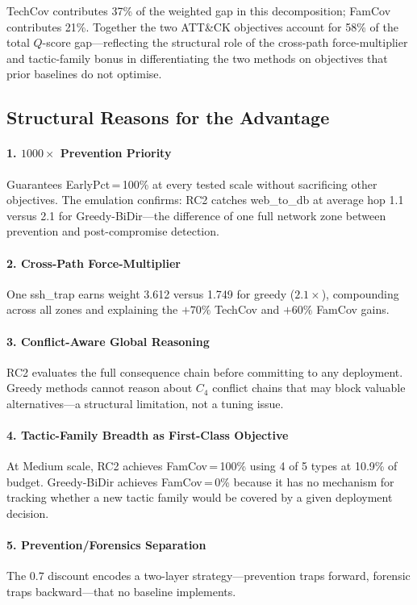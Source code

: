 \documentclass[journal]{IEEEtran}
\newcommand{\qscore}{$Q$-score}
\begin{document}
TechCov contributes 37\% of the weighted gap in this decomposition;
FamCov contributes 21\%. Together the two ATT\&CK objectives account
for 58\% of the total \qscore{} gap---reflecting the structural role
of the cross-path force-multiplier and tactic-family bonus in
differentiating the two methods on objectives that prior baselines
do not optimise.

\subsection{Structural Reasons for the Advantage}

\paragraph{1. $1000\times$ Prevention Priority}
Guarantees EarlyPct\,=\,100\% at every tested scale without
sacrificing other objectives. The emulation confirms: RC2 catches
web\_to\_db at average hop 1.1 versus 2.1 for Greedy-BiDir---the
difference of one full network zone between prevention and
post-compromise detection.

\paragraph{2. Cross-Path Force-Multiplier}
One ssh\_trap earns weight 3.612 versus 1.749 for greedy
($2.1\times$), compounding across all zones and explaining the
$+70\%$ TechCov and $+60\%$ FamCov gains.

\paragraph{3. Conflict-Aware Global Reasoning}
RC2 evaluates the full consequence chain before committing to
any deployment. Greedy methods cannot reason about $C_4$ conflict
chains that may block valuable alternatives---a structural
limitation, not a tuning issue.

\paragraph{4. Tactic-Family Breadth as First-Class Objective}
At Medium scale, RC2 achieves FamCov\,=\,100\% using 4 of 5 types
at 10.9\% of budget. Greedy-BiDir achieves FamCov\,=\,0\% because
it has no mechanism for tracking whether a new tactic family would
be covered by a given deployment decision.

\paragraph{5. Prevention/Forensics Separation}
The $0.7$ discount encodes a two-layer strategy---prevention traps
forward, forensic traps backward---that no baseline implements.
\end{document}
